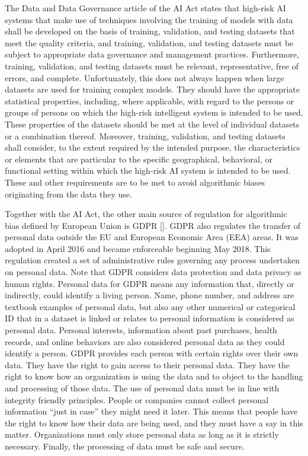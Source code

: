 The Data and Data Governance article of the AI Act states that high-risk AI systems that make use of techniques involving the training of models with data shall be developed on the basis of training, validation, and testing datasets that meet the quality criteria, and training, validation, and testing datasets must be subject to appropriate data governance and management practices. Furthermore, training, validation, and testing datasets must be relevant, representative, free of errors, and complete. Unfortunately, this does not always happen when large datasets are used for training complex models. They should have the appropriate statistical properties, including, where applicable, with regard to the persons or groups of persons on which the high-risk intelligent system is intended to be used. These properties of the datasets should be met at the level of individual datasets or a combination thereof. Moreover, training, validation, and testing datasets shall consider, to the extent required by the intended purpose, the characteristics or elements that are particular to the specific geographical, behavioral, or functional setting within which the high-risk AI system is intended to be used. These and other requirements are to be met to avoid algorithmic biases originating from the data they use.

Together with the AI Act, the other main source of regulation for algorithmic bias defined by European Union is GDPR [\citealt{chap:7:EuropeanUnion:2016}]. GDPR also regulates the transfer of personal data outside the EU and European Economic Area (EEA) areas. It was adopted in April 2016 and became enforceable beginning May 2018. This regulation created a set of administrative rules governing any process undertaken on personal data. Note that GDPR considers data protection and data privacy as human rights. Personal data for GDPR means any information that, directly or indirectly, could identify a living person. Name, phone number, and address are textbook examples of personal data, but also any other numerical or categorical ID that in a dataset is linked or relates to personal information is considered as personal data. Personal interests, information about past purchases, health records, and online behaviors are also considered personal data as they could identify a person. GDPR provides each person with certain rights over their own data. They have the right to gain access to their personal data. They have the right to know how an organization is using the data and to object to the handling and processing of those data. The use of personal data must be in line with integrity friendly principles. People or companies cannot collect personal information ``just in case'' they might need it later. This means that people have the right to know how their data are being used, and they must have a say in this matter. Organizations must only store personal data as long as it is strictly necessary. Finally, the processing of data must be safe and secure.

